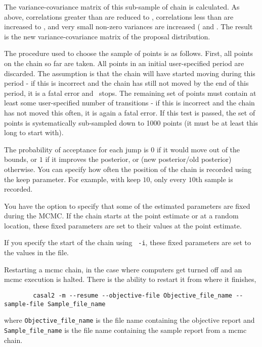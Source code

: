 The variance-covariance matrix of this sub-sample of chain is calculated. As above, correlations greater than  are reduced to , correlations less than  are increased to  , and very small non-zero variances are increased ( and . The result is the new variance-covariance matrix of the proposal distribution. 


The procedure used to choose the sample of points is as follows. First, all points on the chain so far are taken. All points in an initial user-specified period are discarded. The assumption is that the chain will have started moving during this period - if this is incorrect and the chain has still not moved by the end of this period, it is a fatal error and \CNAME\ stops. The remaining set of points must contain at least some user-specified number of transitions - if this is incorrect and the chain has not moved this often, it is again a fatal error. If this test is passed, the set of points is systematically sub-sampled down to 1000 points (it must be at least this long to start with).

The probability of acceptance for each jump is $0$ if it would move out of the bounds, or $1$ if it improves the posterior, or (new posterior/old posterior) otherwise. You can specify how often the position of the chain is recorded using the keep parameter. For example, with keep $10$, only every $10$th sample is recorded. 

You have the option to specify that some of the estimated parameters are fixed during the MCMC. If the chain starts at the point estimate or at a random location, these fixed parameters are set to their values at the point estimate.

If you specify the start of the chain using \texttt{\cname\ -i}, these fixed parameters are set to the values in the file.

Restarting a mcmc chain, in the case where computers get turned off and an mcmc execution is halted. There is the ability to restart it from where it finishes,

{\small{\begin{verbatim}
		casal2 -m --resume --objective-file Objective_file_name --sample-file Sample_file_name
		\end{verbatim}}}
where \texttt{Objective\_file\_name} is the file name containing the objective report and \texttt{Sample\_file\_name} is the file name containing the sample report from a mcmc chain.


